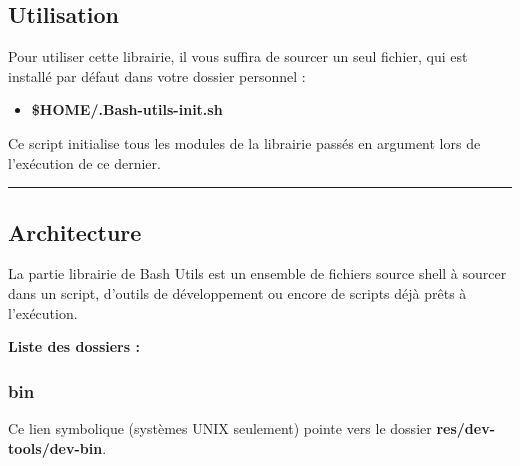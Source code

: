 \documentclass[a4paper,10pt]{article}
\begin{document}
\color{green}
\subsection{Utilisation}\color{white}

\begin{justify}
    Pour utiliser cette librairie, il vous suffira de sourcer un seul fichier, qui est installé par défaut dans votre dossier personnel :

    \begin{itemize}
        \item \textbf{\color{orange}\$HOME\color{lime}/.Bash-utils-init.sh}
    \end{itemize}
\end{justify}

\begin{justify}
    Ce script initialise tous les modules de la librairie passés en argument lors de l'exécution de ce dernier.
\end{justify}




\color{green}\par\noindent\rule{\textwidth}{0.4pt}\color{white}

\color{green}
\subsection{Architecture}\color{white}

\begin{justify}
    La partie librairie de Bash Utils est un ensemble de fichiers source shell à sourcer dans un script, d'outils de développement ou encore de scripts déjà prêts à l'exécution.
\end{justify}


\textbf{Liste des dossiers :}

\color{blue}
\subsubsection{bin}\color{white}

\begin{justify}
    Ce lien symbolique (systèmes UNIX seulement) pointe vers le dossier \textbf{\color{lime}res/dev-tools/dev-bin}.
\end{justify}
\end{document}
